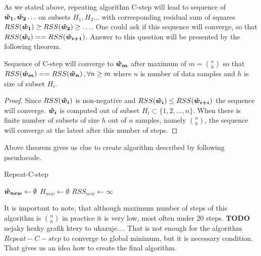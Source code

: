 As we stated above, repeating algorithm C-step will lead to sequence of $\boldsymbol{\hat{w}_1}, \boldsymbol{\hat{w}_2} \ldots$ 
on subsets $H_1, H_2 \ldots$ with corresponding residual sum of squares
$RSS(\boldsymbol{\hat{w}_{1}}) \geq RSS(\boldsymbol{\hat{w}_{2}}) \geq \ldots$. One could ask if this sequence will converge, so that
$RSS(\boldsymbol{\hat{w}_{i}}) == RSS(\boldsymbol{\hat{w}_{i+1}})$. 
Answer to this question will be presented by the following theorem.


\begin{theorem}
	Sequence of C-step will converge to $\boldsymbol{\hat{w}_{m}}$ after maximum of $m = {n \choose h}$
	so that $RSS(\boldsymbol{\hat{w}_{m}}) == RSS(\boldsymbol{\hat{w}_{n}})\,, \forall n\geq m$ where $n$ is number of data samples 
	and $h$ is size of subset $H_i$.
\end{theorem}

\begin{proof}
	Since  $RSS(\boldsymbol{\hat{w}_{i}})$ is non-negative and $RSS(\boldsymbol{\hat{w}_{i}}) \leq RSS(\boldsymbol{\hat{w}_{i+i}})$ the 
	sequence will converge. $\boldsymbol{\hat{w}_{i}}$  is computed out of subset 
	$H_i \subset \{{1,2,\ldots,n\}}$. When there is finite number of subsets of size $h$ out of $n$ samples, namely ${n \choose h}$, the sequence will converge at the latest after this number of steps.
\end{proof}

Above theorem gives us clue to create algorithm described by following pseudocode.

\begin{algorithm}[H]
	\label{alg:RepeatCstep}
	\caption{Repeat-C-step}
	$\boldsymbol{\hat{w}_{new}} \gets \emptyset$\;
	$H_{new} \gets \emptyset$\;
	$RSS_{new} \gets \infty $\;


	\;
\end{algorithm}

It is important to note, that although maximum number of steps of this algorithm is ${n \choose h}$ in practice it is very low, most often under $20$ steps. $\boldsymbol{TODO}$ nejaky hezky grafik ktery to ukazuje....
That is not enough for the algorithm $Repeat-C-step$ to converge to global minimum, but it is necessary condition. That gives us an idea how to create the final algorithm. \cite{rouss:2000}

